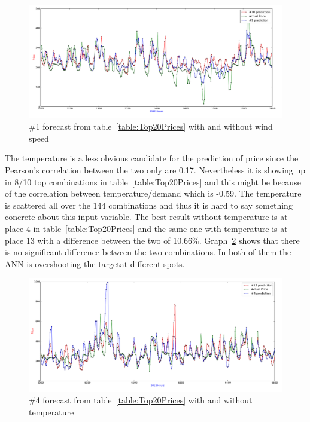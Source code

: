 \begin{figure}[H]
\centering
\includegraphics[width=\linewidth,natwidth=898,natheight=587]{billeder/PriceExperimentalAnalysis/X1_windspeed_vs_no_windspeed.png}
\caption{\#1 forecast from table~\ref{table:Top20Prices} with and without wind speed}
\label{fig:Windspeed_no_windspeed}
\end{figure}

The temperature is a less obvious candidate for the prediction of price since the Pearson's correlation between the two only are 0.17. Nevertheless it is showing up in 8/10 top combinations in table~\ref{table:Top20Prices} and this might be because of the correlation between temperature/demand which is -0.59. The temperature is scattered all over the 144 combinations and thus it is hard to say something concrete about this input variable. The best result without temperature is at place 4 in table~\ref{table:Top20Prices} and the same one with temperature is at place 13 with a difference between the two of 10.66\%. Graph~\ref{fig:temperature_comparison} shows that there is no significant difference between the two combinations. In both of them the ANN is overshooting the targetat different spots.

\begin{figure}[H]
\centering
\includegraphics[width=\linewidth,natwidth=898,natheight=587]{billeder/PriceExperimentalAnalysis/temperatureComparison.png}
\caption{\#4 forecast from table~\ref{table:Top20Prices} with and without temperature}
\label{fig:temperature_comparison}
\end{figure}

